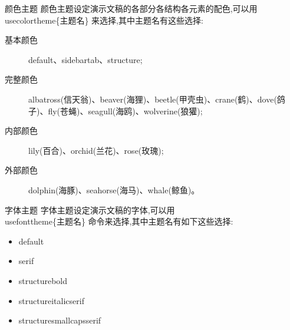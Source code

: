 \begin{frame}{颜色主题}
颜色主题设定演示文稿的各部分各结构各元素的配色,可以用\\usecolortheme\{主题名\} 来选择,其中主题名有这些选择:

\begin{description}
    \item [基本颜色] default、sidebartab、structure;
    \item [完整颜色] albatross(信天翁)、beaver(海狸)、beetle(甲壳虫)、crane(鹤)、dove(鸽子)、fly(苍蝇)、seagull(海鸥)、wolverine(狼獾);
    \item [内部颜色] lily(百合)、orchid(兰花)、rose(玫瑰);
    \item [外部颜色] dolphin(海豚)、seahorse(海马)、whale(鲸鱼)。
\end{description}
\end{frame}

\begin{frame}{字体主题}
字体主题设定演示文稿的字体,可以用 \\usefonttheme\{主题名\} 命令来选择,其中主题名有如下这些选择:
\begin{itemize}
    \item default
    \item serif
    \item structurebold
    \item structureitalicserif
    \item structuresmallcapsserif
\end{itemize}
\end{frame}


\fi


